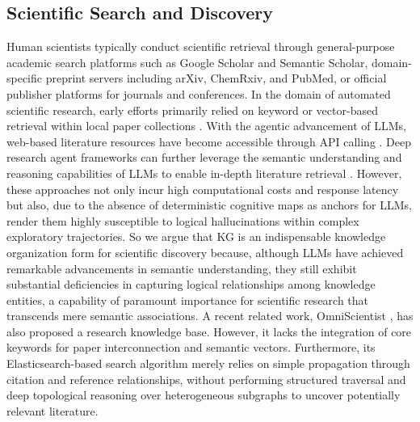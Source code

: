 \subsection{Scientific Search and Discovery}
Human scientists typically conduct scientific retrieval through general-purpose academic search platforms such as Google Scholar and Semantic Scholar, domain-specific preprint servers including arXiv, ChemRxiv, and PubMed, or official publisher platforms for journals and conferences.
In the domain of automated scientific research, early efforts primarily relied on keyword or vector-based retrieval within local paper collections \citep{researchagent,virsci,rnd,scipip}.
With the agentic advancement of LLMs, web-based literature resources have become accessible through API calling \citep{can-llm-gen-novel,chain-of-ideas,deep-ideation,ai-researcher,internagent,innoeval}.
Deep research agent frameworks can further leverage the semantic understanding and reasoning capabilities of LLMs to enable in-depth literature retrieval \citep{deepxiv,wispaper,opennovelty}.
However, these approaches not only incur high computational costs and response latency but also, due to the absence of deterministic cognitive maps as anchors for LLMs, render them highly susceptible to logical hallucinations within complex exploratory trajectories.
So we argue that KG is an indispensable knowledge organization form for scientific discovery because, although LLMs have achieved remarkable advancements in semantic understanding, they still exhibit substantial deficiencies in capturing logical relationships among knowledge entities, a capability of paramount importance for scientific research that transcends mere semantic associations.
A recent related work, OmniScientist \citep{omniscientist}, has also proposed a research knowledge base.
However, it lacks the integration of core keywords for paper interconnection and semantic vectors.
Furthermore, its Elasticsearch-based search algorithm merely relies on simple propagation through citation and reference relationships, without performing structured traversal and deep topological reasoning over heterogeneous subgraphs to uncover potentially relevant literature.